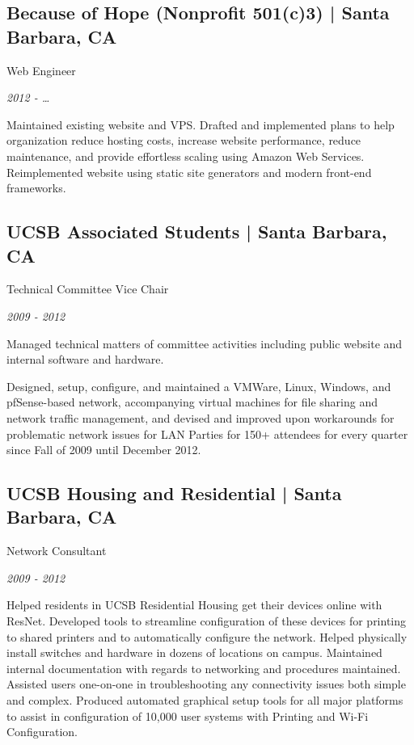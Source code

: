 \documentclass[10pt, letter]{article}
\newcommand{\years}[1]{\marginnote{#1}}
\renewcommand{\years}[1]{{\emph{#1}}}
\begin{document}
\begin{multicols}{2}
\subsection*{Because of Hope (Nonprofit 501(c)3) | {\footnotesize{Santa Barbara, CA}}}

Web Engineer

\years{2012 - \ldots}

Maintained existing website and VPS. Drafted and implemented plans to help
organization reduce hosting costs, increase website performance, reduce
maintenance, and provide effortless scaling using Amazon Web Services.
Reimplemented website using static site generators and modern front-end
frameworks.

\subsection*{UCSB Associated Students | {\footnotesize{Santa Barbara, CA}}}

Technical Committee Vice Chair

\years{2009 - 2012}

Managed technical matters of committee activities including public website
and internal software and hardware.

Designed, setup, configure, and maintained a VMWare, Linux, Windows, and
pfSense-based network, accompanying virtual machines for file sharing and
network traffic management, and devised and improved upon workarounds for
problematic network issues for LAN Parties for 150+ attendees for every
quarter since Fall of 2009 until December 2012.

\subsection*{UCSB Housing and Residential | {\footnotesize{Santa Barbara, CA}}}

Network Consultant

\years{2009 - 2012}

Helped residents in UCSB Residential Housing get their devices online with
ResNet.  Developed tools to streamline configuration of these devices for
printing to shared printers and to automatically configure the network. Helped
physically install switches and hardware in dozens of locations on campus.
Maintained internal documentation with regards to networking and procedures
maintained. Assisted users one-on-one in troubleshooting any connectivity
issues both simple and complex. Produced automated graphical setup tools for
all major platforms to assist in configuration of 10,000 user systems with
Printing and Wi-Fi Configuration.


\end{multicols}
\end{document}
